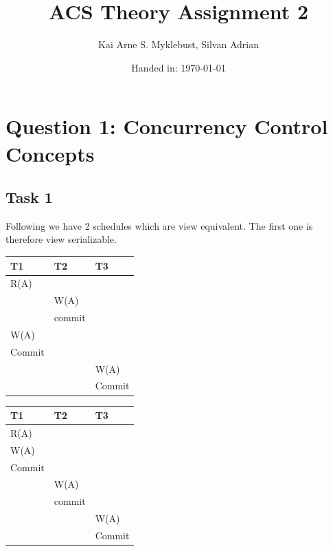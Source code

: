 \documentclass[12pt,a4paper]{article}
\begin{document}
\title{ACS Theory Assignment 2}
\subtitle{}

\author{Kai Arne S. Myklebust, Silvan Adrian}
\date{Handed in: \today}
	
\maketitle
\tableofcontents

\section{Question 1: Concurrency Control Concepts}

\subsection{Task 1}
Following we have 2 schedules which are view equivalent. The first one is therefore view serializable.

\begin{table}[!htbp]
    \centering
    \begin{tabularx}{\textwidth}{l|l|l}
        \hline
        T1 & T2 & T3 \\ 
        \hline
        R(A) &  &  \\
             & W(A) & \\
             & commit & \\
        W(A) & & \\
        Commit & & \\
        		& & W(A) \\
        		& & Commit \\     
        \hline
    \end{tabularx}
\end{table}

\begin{table}[!htbp]
    \centering
    \begin{tabularx}{\textwidth}{l|l|l}
        \hline
        T1 & T2 & T3 \\ 
        \hline
        R(A) &  &  \\
        W(A) & & \\
        Commit & & \\        
             & W(A) & \\
             & commit & \\
        		& & W(A) \\
        		& & Commit \\     
        \hline
    \end{tabularx}
\end{table}
\end{document}
